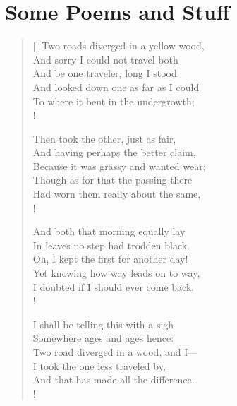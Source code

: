 \documentclass[../butidigress.tex]{subfiles}
\begin{document}
\renewcommand{\Dparsep}{\parskip}

\chapter{Some Poems and Stuff}\label{chap:poemsandstuff}
\newpage

\setlength{\versewidth}{39ex}
\begin{verse}[\versewidth]
Two roads diverged in a yellow wood, \\
And sorry I could not travel both \\
And be one traveler, long I stood \\
And looked down one as far as I could \\
To where it bent in the undergrowth; \\!

Then took the other, just as fair, \\
And having perhaps the better claim, \\
Because it was grassy and wanted wear; \\
Though as for that the passing there \\
Had worn them really about the same, \\!

And both that morning equally lay \\
In leaves no step had trodden black. \\
Oh, I kept the first for another day! \\
Yet knowing how way leads on to way, \\
I doubted if I should ever come back. \\!

I shall be telling this with a sigh \\
Somewhere ages and ages hence: \\
Two road diverged in a wood, and I--- \\
I took the one less traveled by, \\
And that has made all the difference. \\!
\end{verse}

\newpage
\end{document}
